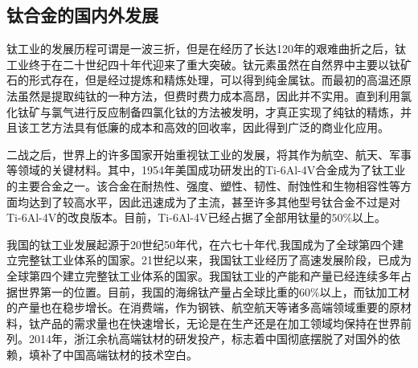 \subsection{钛合金的国内外发展}
%

钛工业的发展历程可谓是一波三折，但是在经历了长达120年的艰难曲折之后，钛工业终于在二十世纪四十年代迎来了重大突破。钛元素虽然在自然界中主要以钛矿石的形式存在，但是经过提炼和精炼处理，可以得到纯金属钛。而最初的高温还原法虽然是提取纯钛的一种方法，但费时费力成本高昂，因此并不实用。直到利用氯化钛矿与氯气进行反应制备四氯化钛的方法被发明，才真正实现了纯钛的精炼，并且该工艺方法具有低廉的成本和高效的回收率，因此得到广泛的商业化应用。

二战之后，世界上的许多国家开始重视钛工业的发展，将其作为航空、航天、军事等领域的关键材料。其中，1954年美国成功研发出的Ti-6Al-4V合金成为了钛工业的主要合金之一。该合金在耐热性、强度、塑性、韧性、耐蚀性和生物相容性等方面均达到了较高水平，因此迅速成为了主流，甚至许多其他型号钛合金不过是对Ti-6Al-4V的改良版本。目前，Ti-6Al-4V已经占据了全部用钛量的$ 50\% $以上\cite{COLO200102000}。


我国的钛工业发展起源于20世纪50年代，在六七十年代,我国成为了全球第四个建立完整钛工业体系的国家。21世纪以来，我国钛工业经历了高速发展阶段，已成为全球第四个建立完整钛工业体系的国家。我国钛工业的产能和产量已经连续多年占据世界第一的位置。目前，我国的海绵钛产量占全球比重的$ 60\% $以上，而钛加工材的产量也在稳步增长。在消费端，作为钢铁、航空航天等诸多高端领域重要的原材料，钛产品的需求量也在快速增长\cite{JSTB202209001}，无论是在生产还是在加工领域均保持在世界前列。2014年，浙江余杭高端钛材的研发投产，标志着中国彻底摆脱了对国外的依赖，填补了中国高端钛材的技术空白。\cite{TGYJ200405004}

